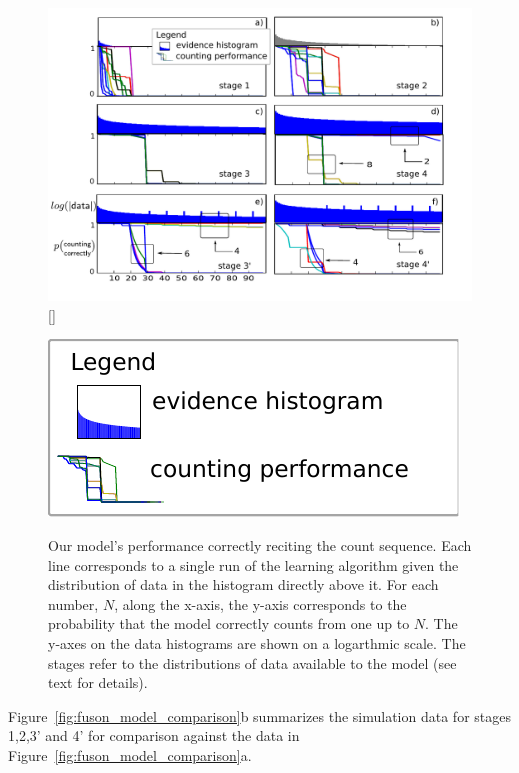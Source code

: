 \documentclass[10pt,letterpaper]{article}
\begin{document}
\begin{figure}[t]
  \includegraphics[width=\linewidth]{figures/counting_grid2}
  [\FBwidth]
  {\caption{Our model's performance correctly reciting the count
      sequence. Each line corresponds to a single run of the learning
      algorithm given the distribution of data in the histogram
      directly above it. For each number, $N$, along the x-axis, the
      y-axis corresponds to the probability that the model correctly
      counts from one up to $N$. The y-axes on the data histograms are
      shown on a logarthmic scale. The stages refer to the
      distributions of data available to the model (see text for details).
    }\label{fig:counting_grid}}
           {\includegraphics[width=.2\textwidth]{figures/legend.pdf}}
\end{figure}


Figure~\ref{fig:fuson_model_comparison}b summarizes the simulation
data for stages 1,2,3' and 4' for comparison against the
\citet{FusRicBriar1982} data in Figure~\ref{fig:fuson_model_comparison}a.

\end{document}
